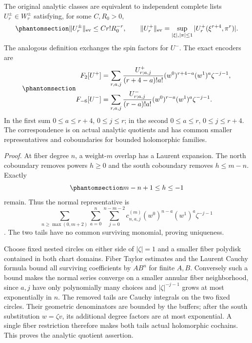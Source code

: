 \documentclass[
  english,
  11pt,
  reqno]{amsart}
\begin{document}
The original analytic classes are equivalent to independent complete
lists \(U_r^\pm\in W_r^\pm\) satisfying, for some \(C,R_0>0\),
\begin{equation}\protect\phantomsection\label{eq:gg-original-factorial-bound}{
 \|U_r^\pm\|_{\mathrm{ev}}\le Cr!R_0^{-r},\qquad
 \|U_r^+\|_{\mathrm{ev}}
  =\sup_{|\xi|,|\pi|\le1}|U_r^+(\xi^{r+4},\pi^r)|.
}\end{equation} The analogous definition exchanges the spin factors for
\(U^-\). The exact encoders are
\begin{equation}\protect\phantomsection\label{eq:gg-original-encoders}{
 \begin{aligned}
 F_2[U^+]&=\sum_{r,a,j}
 \frac{U^+_{r;a,j}}{(r+4-a)!a!}
 (w^0)^{r+4-a}(w^1)^a\zeta^{-j-1},\\
 F_{-6}[U^-]&=\sum_{r,a,j}
 \frac{U^-_{r;a,j}}{(r-a)!a!}
 (w^0)^{r-a}(w^1)^a\zeta^{-j-1}.
 \end{aligned}
}\end{equation} In the first sum \(0\le a\le r+4\), \(0\le j\le r\); in
the second \(0\le a\le r\), \(0\le j\le r+4\). The correspondence is on
actual analytic quotients and has common smaller representatives and
coboundaries for bounded holomorphic families.

\emph{Proof.} At fiber degree \(n\), a weight-\(m\) overlap has a
Laurent expansion. The north coboundary removes powers \(h\ge0\) and the
south coboundary removes \(h\le m-n\). Exactly
\begin{equation}\protect\phantomsection\label{eq:gg-surviving-laurent}{
 m-n+1\le h\le-1
}\end{equation} remain. Thus the normal representative is
\[\sum_{n\ge\max(0,m+2)}\sum_{a=0}^n\sum_{j=0}^{n-m-2}
c^{(m)}_{n,a,j}(w^0)^{n-a}(w^1)^a\zeta^{-j-1}\]. The two tails have no
common surviving monomial, proving uniqueness.

Choose fixed nested circles on either side of \(|\zeta|=1\) and a
smaller fiber polydisk contained in both chart domains. Fiber Taylor
estimates and the Laurent Cauchy formula bound all surviving
coefficients by \(AB^n\) for finite \(A,B\). Conversely such a bound
makes the normal series converge on a smaller annular fiber
neighborhood, since \(a,j\) have only polynomially many choices and
\(|\zeta|^{-j-1}\) grows at most exponentially in \(n\). The removed
tails are Cauchy integrals on the two fixed circles. Their geometric
denominators are bounded by the buffers; after the south substitution
\(w=\zeta v\), its additional degree factors are at most exponential. A
single fiber restriction therefore makes both tails actual holomorphic
cochains. This proves the analytic quotient assertion.
\end{document}
